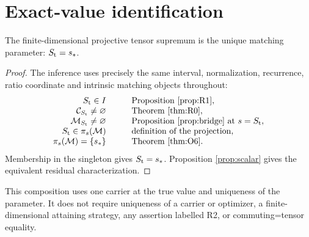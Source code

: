 \section{Exact-value identification}\label{sec:identification}
\begin{theorem}\label{thm:O7}
The finite-dimensional projective tensor supremum is the unique matching
parameter: \(S_{\mathrm t}=s_*\).
\end{theorem}
\begin{proof}
The inference uses precisely the same interval, normalization, recurrence,
ratio coordinate and intrinsic matching objects throughout:
\[
\begin{array}{rcll}
 S_{\mathrm t}\in I
 &&&\text{Proposition~\ref{prop:R1}},\\
 \mathcal C_{S_{\mathrm t}}\ne\varnothing
 &&&\text{Theorem~\ref{thm:R0}},\\
 \mathcal M_{S_{\mathrm t}}\ne\varnothing
 &&&\text{Proposition~\ref{prop:bridge} at }s=S_{\mathrm t},\\
 S_{\mathrm t}\in\pi_s(\mathcal M)
 &&&\text{definition of the projection},\\
 \pi_s(\mathcal M)=\{s_*\}
 &&&\text{Theorem~\ref{thm:O6}}.
\end{array}
\]
Membership in the singleton gives \(S_{\mathrm t}=s_*\). Proposition
\ref{prop:scalar} gives the equivalent residual characterization.
\end{proof}
This composition uses one carrier at the true value and uniqueness of the
parameter. It does not require uniqueness of a carrier or optimizer, a
finite-dimensional attaining strategy, any assertion labelled R2, or
commuting=tensor equality.

